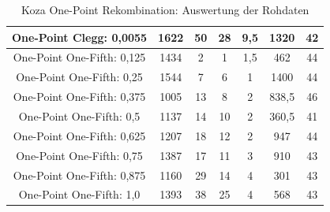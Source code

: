 \begin{table}[H]
\begin{tabular}{c | c | c | c | c | c | c}
		\hline
		One-Point Clegg: 0,0055 & 1622 & 50 & 28 & 9,5 & 1320 & 42\\
		\hline
		One-Point One-Fifth: 0,125 & 1434 & 2 & 1 & 1,5 & 462 & 44\\
		\hline
		One-Point One-Fifth: 0,25 & 1544 & 7 & 6 & 1 & 1400 & 44\\
		\hline
		One-Point One-Fifth: 0,375 & 1005 & 13 & 8 & 2 & 838,5 & 46\\
		\hline
		One-Point One-Fifth: 0,5 & 1137 & 14 & 10 & 2 & 360,5 & 41\\
		\hline
		One-Point One-Fifth: 0,625 & 1207 & 18 & 12 & 2 & 947 & 44\\
		\hline
		One-Point One-Fifth: 0,75 & 1387 & 17 & 11 & 3 & 910 & 43\\
		\hline
		One-Point One-Fifth: 0,875 & 1160 & 29 & 14 & 4 & 301 & 43\\
		\hline
		One-Point One-Fifth: 1,0 & 1393 & 38 & 25 & 4 & 568 & 43\\
	\end{tabular}
	\caption{Koza One-Point Rekombination: Auswertung der Rohdaten}
	\label{table:kozaOnePointRohdaten}
\end{table}



